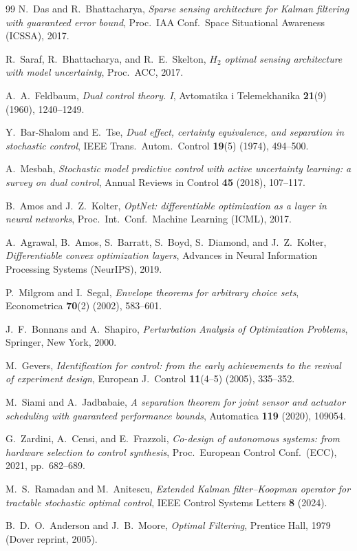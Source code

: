 \documentclass[11pt]{article}
\begin{document}
\begin{thebibliography}{99}
N.~Das and R.~Bhattacharya,
\emph{Sparse sensing architecture for Kalman filtering with guaranteed error
bound}, Proc.\ IAA Conf.\ Space Situational Awareness (ICSSA), 2017.

R.~Saraf, R.~Bhattacharya, and R.~E.~Skelton,
\emph{$H_2$ optimal sensing architecture with model uncertainty},
Proc.\ ACC, 2017.

A.~A.~Feldbaum,
\emph{Dual control theory. I},
Avtomatika i Telemekhanika \textbf{21}(9) (1960), 1240--1249.

Y.~Bar-Shalom and E.~Tse,
\emph{Dual effect, certainty equivalence, and separation in stochastic control},
IEEE Trans.\ Autom.\ Control \textbf{19}(5) (1974), 494--500.

A.~Mesbah,
\emph{Stochastic model predictive control with active uncertainty learning: a
survey on dual control},
Annual Reviews in Control \textbf{45} (2018), 107--117.

B.~Amos and J.~Z.~Kolter,
\emph{OptNet: differentiable optimization as a layer in neural networks},
Proc.\ Int.\ Conf.\ Machine Learning (ICML), 2017.

A.~Agrawal, B.~Amos, S.~Barratt, S.~Boyd, S.~Diamond, and J.~Z.~Kolter,
\emph{Differentiable convex optimization layers},
Advances in Neural Information Processing Systems (NeurIPS), 2019.

P.~Milgrom and I.~Segal,
\emph{Envelope theorems for arbitrary choice sets},
Econometrica \textbf{70}(2) (2002), 583--601.

J.~F.~Bonnans and A.~Shapiro,
\emph{Perturbation Analysis of Optimization Problems},
Springer, New York, 2000.

M.~Gevers,
\emph{Identification for control: from the early achievements to the revival of
experiment design},
European J.\ Control \textbf{11}(4--5) (2005), 335--352.

M.~Siami and A.~Jadbabaie,
\emph{A separation theorem for joint sensor and actuator scheduling with
guaranteed performance bounds},
Automatica \textbf{119} (2020), 109054.

G.~Zardini, A.~Censi, and E.~Frazzoli,
\emph{Co-design of autonomous systems: from hardware selection to control
synthesis},
Proc.\ European Control Conf.\ (ECC), 2021, pp.~682--689.

M.~S.~Ramadan and M.~Anitescu,
\emph{Extended Kalman filter--Koopman operator for tractable stochastic optimal
control},
IEEE Control Systems Letters \textbf{8} (2024).

B.~D.~O.~Anderson and J.~B.~Moore,
\emph{Optimal Filtering},
Prentice Hall, 1979 (Dover reprint, 2005).

\end{thebibliography}
\end{document}
